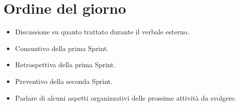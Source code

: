 

\section{Ordine del giorno}

\begin{itemize}
    \item Discussione su quanto trattato durante il verbale esterno.
    \item Consuntivo della prima Sprint.
    \item Retrospettiva della prima Sprint.
    \item Preventivo della seconda Sprint.
    \item Parlare di alcuni aspetti organizzativi delle prossime attività da svolgere.
\end{itemize}